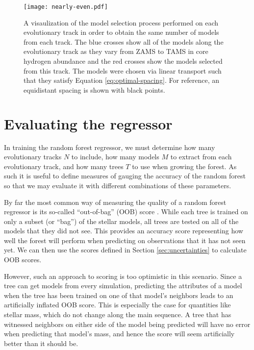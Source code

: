 \documentclass[manuscript,linenumbers]{aastex6}
\begin{document}
\begin{figure*}
    \centering
    \texttt{[image: nearly-even.pdf]}
    \caption{ A visaulization of the model selection process performed on each evolutionary track in order to obtain the same number of models from each track. The blue crosses show all of the models along the evolutionary track as they vary from ZAMS to TAMS in core hydrogen abundance and the red crosses show the models selected from this track. The models were chosen via linear transport such that they satisfy Equation \ref{eq:optimal-spacing}. For reference, an equidistant spacing is shown with black points. \vspace*{5mm}
    \label{fig:nearly-even} }%
\end{figure*}


\section{Evaluating the regressor}
\label{sec:evaluation}
In training the random forest regressor, we must determine how many evolutionary tracks $N$ to include, how many models $M$ to extract from each evolutionary track, and how many trees $T$ to use when growing the forest. As such it is useful to define measures of gauging the accuracy of the random forest so that we may evaluate it with different combinations of these parameters. 

By far the most common way of measuring the quality of a random forest regressor is its so-called ``out-of-bag'' (OOB) score \citep[see e.g.\ section 3.1 of][]{breiman2001random}. While each tree is trained on only a subset (or ``bag'') of the stellar models, all trees are tested on all of the models that they did not see. This provides an accuracy score representing how well the forest will perform when predicting on observations that it has not seen yet. We can then use the scores defined in Section \ref{sec:uncertainties} to calculate OOB scores. 

However, such an approach to scoring is too optimistic in this scenario. Since a tree can get models from every simulation, predicting the attributes of a model when the tree has been trained on one of that model's neighbors leads to an artificially inflated OOB score. This is especially the case for quantities like stellar mass, which do not change along the main sequence. A tree that has witnessed neighbors on either side of the model being predicted will have no error when predicting that model's mass, and hence the score will seem artificially better than it should be. 
\end{document}
